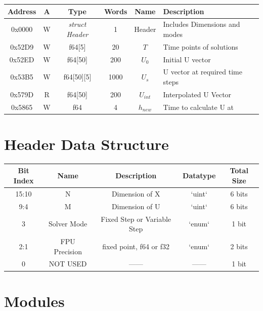 \documentclass[12pt]{report}
\begin{document}
\begin{center}
 \begin{tabular}{||c |c| c| c| c| l||} 
 \hline
 Address & A & Type & Words & Name & Description  \\ [0.5ex] 
 \hline\hline
  0x0000 & W & \emph{struct Header} & 1 & Header & Includes Dimensions and modes  \\ 
 \hline
 0x52D9  & W & f64[5] & 20 & $T$ & Time points of solutions  \\
 \hline
 0x52ED  & W & f64[50] & 200 & $U_0$ & Initial U vector \\
 \hline
 0x53B5  & W & f64[50][5] & 1000 & $U_s$ & U vector at required time steps \\
 \hline
 0x579D  & R & f64[50] & 200 & $U_{int}$ & Interpolated U Vector \\
 \hline
 0x5865  & W & f64 & 4 & $h_{new}$ & Time to calculate U at \\ [1ex]
 \hline
\end{tabular}
\end{center}

\section{Header Data Structure}

\begin{center}
 \begin{tabular}{||c |c| c| c| c||} 
 \hline
 Bit Index & Name & Description & Datatype & Total Size \\ [0.5ex] 
 \hline\hline
  15:10 & N & Dimension of X  & `uint` & 6 bits  \\ 
 \hline
 9:4 & M & Dimension of U  & `uint` & 6 bits  \\ 
 \hline
 3 & Solver Mode & Fixed Step or Variable Step  & `enum` & 1 bit \\ 
 \hline
 2:1 & FPU Precision & fixed point, f64 or f32 & `enum` & 2 bits  \\ 
 \hline
 0  & NOT USED &  ------ & ------ & 1 bit \\ [1ex] 
 \hline
\end{tabular}
\end{center}

\section{Modules}
\end{document}
